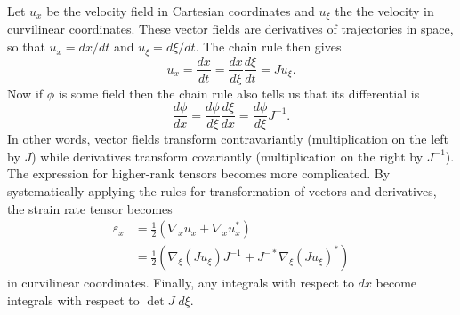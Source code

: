 \documentclass{article}
\theoremstyle{definition}
\theoremstyle{plain}
\begin{document}
Let $u_x$ be the velocity field in Cartesian coordinates and $u_\xi$ the the velocity in curvilinear coordinates.
These vector fields are derivatives of trajectories in space, so that $u_x = dx/dt$ and $u_\xi = d\xi/dt$.
The chain rule then gives
\begin{equation}
    u_x = \frac{dx}{dt} = \frac{dx}{d\xi}\frac{d\xi}{dt} = Ju_\xi.
\end{equation}
Now if $\phi$ is some field then the chain rule also tells us that its differential is
\begin{equation}
    \frac{d\phi}{dx} = \frac{d\phi}{d\xi}\frac{d\xi}{dx} = \frac{d\phi}{d\xi}J^{-1}.
\end{equation}
In other words, vector fields transform contravariantly (multiplication on the left by $J$) while derivatives transform covariantly (multiplication on the right by $J^{-1}$).
The expression for higher-rank tensors becomes more complicated.
By systematically applying the rules for transformation of vectors and derivatives, the strain rate tensor becomes
\begin{align}
    \dot\varepsilon_x & = \frac{1}{2}\left(\nabla_xu_x + \nabla_xu_x^*\right) \nonumber \\
    & = \frac{1}{2}\left(\nabla_\xi(Ju_\xi)J^{-1} + J^{-*}\nabla_\xi(Ju_\xi)^*\right)
\end{align}
in curvilinear coordinates.
Finally, any integrals with respect to $dx$ become integrals with respect to $\det J\;d\xi$.
\end{document}
